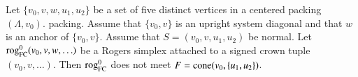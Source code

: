 %
%



\begin{lemma}
Let $\{v_0,v,w,u_1,u_2\}$ be a set of five distinct vertices in a
centered packing $(\Lambda,v_0)$.
packing.  Assume that $\{v_0,v\}$ is an upright system diagonal
and that $w$ is an anchor of $\{v_0,v\}$.
Assume that $S=(v_0,v,u_1,u_2)$ be normal.
Let ${\operatorname{rog}}^0_{\text{FC}}(v_0,v,w,\ldots)$ be 
a Rogers simplex attached to a signed crown tuple $(v_0,v,\ldots)$.
Then ${\operatorname{rog}}^0_{\text{FC}}$ does not meet $F={\operatorname{cone}}(v_0,\{u_1,u_2\})$.
\end{lemma}



